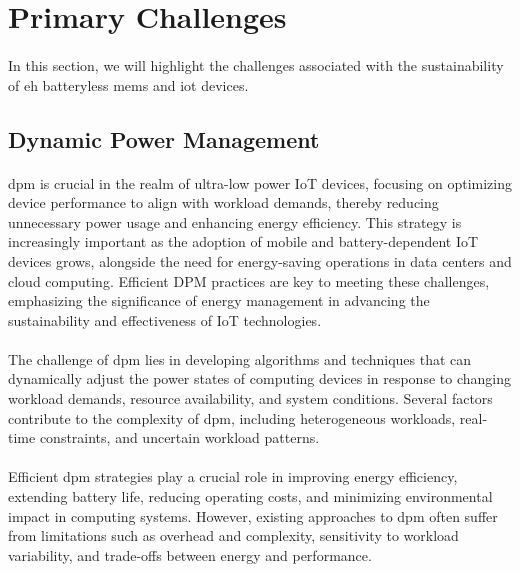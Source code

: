 \section{Primary Challenges}

    \paragraph{}
    In this section, we will highlight the challenges associated with the sustainability of \gls{eh} batteryless \gls{mems} and \gls{iot} devices.

    \subsection{Dynamic Power Management}

        \paragraph{}
        \gls{dpm} is crucial in the realm of ultra-low power IoT devices, focusing on optimizing device performance to align with workload demands, thereby reducing unnecessary power usage and enhancing energy efficiency. This strategy is increasingly important as the adoption of mobile and battery-dependent IoT devices grows, alongside the need for energy-saving operations in data centers and cloud computing. Efficient DPM practices\cite{powerMngtIoT} are key to meeting these challenges, emphasizing the significance of energy management in advancing the sustainability and effectiveness of IoT technologies.

        \paragraph{}
        The challenge of \gls{dpm} lies in developing algorithms and techniques that can dynamically adjust the power states of computing devices in response to changing workload demands, resource availability, and system conditions. Several factors contribute to the complexity of \gls{dpm}, including heterogeneous workloads, real-time constraints, and uncertain workload patterns\cite{10387280}.

        \paragraph{}
        Efficient \gls{dpm} strategies play a crucial role in improving energy efficiency, extending battery life, reducing operating costs, and minimizing environmental impact in computing systems. However, existing approaches to \gls{dpm} often suffer from limitations such as overhead and complexity, sensitivity to workload variability, and trade-offs between energy and performance.

